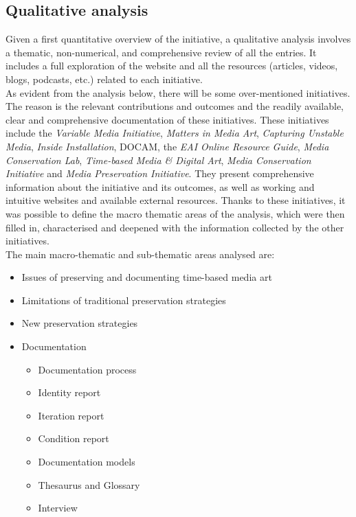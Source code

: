 \subsection{Qualitative analysis}
Given a first quantitative overview of the initiative, a qualitative analysis involves a thematic, non-numerical, and comprehensive review of all the entries. It includes a full exploration of the website and all the resources (articles, videos, blogs, podcasts, etc.) related to each initiative.\\
As evident from the analysis below, there will be some over-mentioned initiatives. The reason is the relevant contributions and outcomes and the readily available, clear and comprehensive documentation of these initiatives. These initiatives include the \textit{Variable Media Initiative}, \textit{Matters in Media Art}, \textit{Capturing Unstable Media}, \textit{Inside Installation}, DOCAM, the \textit{EAI Online Resource Guide}, \textit{Media Conservation Lab}, \textit{Time-based Media \& Digital Art}, \textit{Media Conservation Initiative} and \textit{Media Preservation Initiative}. They present comprehensive information about the initiative and its outcomes, as well as working and intuitive websites and available external resources. Thanks to these initiatives, it was possible to define the macro thematic areas of the analysis, which were then filled in, characterised and deepened with the information collected by the other initiatives.\\
The main macro-thematic and sub-thematic areas analysed are:
\begin{itemize}
    \item Issues of preserving and documenting time-based media art
    \item Limitations of traditional preservation strategies
    \item New preservation strategies
    \item Documentation
    \begin{itemize}
        \item Documentation process
        \item Identity report
        \item Iteration report
        \item Condition report
        \item Documentation models
        \item Thesaurus and Glossary
        \item Interview
    \end{itemize}
\end{itemize}
